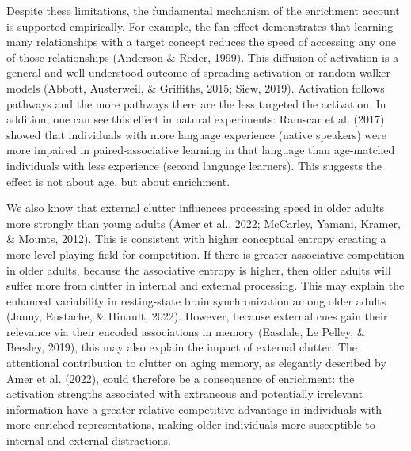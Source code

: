 \documentclass[
  man,floatsintext]{apa6}
\begin{document}
Despite these limitations, the fundamental mechanism of the enrichment account is supported empirically. For example, the fan effect demonstrates that learning many relationships with a target concept reduces the speed of accessing any one of those relationships (Anderson \& Reder, 1999). This diffusion of activation is a general and well-understood outcome of spreading activation or random walker models (Abbott, Austerweil, \& Griffiths, 2015; Siew, 2019). Activation follows pathways and the more pathways there are the less targeted the activation. In addition, one can see this effect in natural experiments: Ramscar et al. (2017) showed that individuals with more language experience (native speakers) were more impaired in paired-associative learning in that language than age-matched individuals with less experience (second language learners). This suggests the effect is not about age, but about enrichment.

We also know that external clutter influences processing speed in older adults more strongly than young adults (Amer et al., 2022; McCarley, Yamani, Kramer, \& Mounts, 2012). This is consistent with higher conceptual entropy creating a more level-playing field for competition. If there is greater associative competition in older adults, because the associative entropy is higher, then older adults will suffer more from clutter in internal and external processing. This may explain the enhanced variability in resting-state brain synchronization among older adults (Jauny, Eustache, \& Hinault, 2022). However, because external cues gain their relevance via their encoded associations in memory (Easdale, Le Pelley, \& Beesley, 2019), this may also explain the impact of external clutter. The attentional contribution to clutter on aging memory, as elegantly described by Amer et al. (2022), could therefore be a consequence of enrichment: the activation strengths associated with extraneous and potentially irrelevant information have a greater relative competitive advantage in individuals with more enriched representations, making older individuals more susceptible to internal and external distractions.
\end{document}
